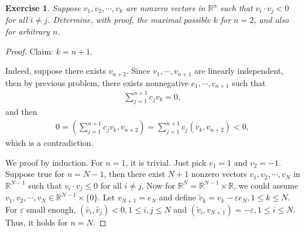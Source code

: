 \documentclass[11pt]{book}
\newtheorem{exercise}{Exercise}[section]
\theoremstyle{definition}
\numberwithin{equation}{chapter}
\begin{document}
\medskip

\begin{exercise}{\bf *}
Suppose $v_1, v_2, \cdots, v_k$ are nonzero vectors in $\mathbb{R}^n$ such that $v_i \cdot v_j < 0$ for all $i \neq j$. Determine, with proof, the maximal possible $k$ for $n = 2$, and also for arbitrary $n$.
\end{exercise}
\begin{proof}
Claim: $k = n + 1$. 

Indeed, suppose there exists $v_{n+2}$. Since $v_1, \cdots, v_{n+1}$ are linearly independent, then by previous problem, there exists nonnegative $c_1, \cdots, c_{n+1}$ such that
\begin{align*}
    \sum^{n+1}_{j=1} c_j v_k = 0,
\end{align*}
and then
\begin{align*}
    0 = \left(\sum^{n+1}_{j=1} c_j v_k, v_{n+2}\right) = \sum^{n+1}_{j=1} c_j \left(v_k, v_{n+2} \right) < 0,
\end{align*}
which is a contradiction. 

We proof by induction. For $n = 1$, it is trivial. Just pick $v_1 = 1$ and $v_2 = -1$. Suppose true for $n = N - 1$, then there exist $N+1$ nonzero vectors $v_1, v_2, \cdots, v_{N}$ in $\mathbb{R}^{N-1}$ such that $v_i \cdot v_j \leq 0$ for all $i \neq j$. Now for $\mathbb{R}^N = \mathbb{R}^{N-1} \times \mathbb{R}$, we could assume $v_1, v_2, \cdots, v_{N} \in \mathbb{R}^{N-1} \times \{0\}$. Let $v_{N+1} = e_N$ and define $\widetilde{v}_k = v_k - \varepsilon e_N, 1 \leq k \leq N$. For $\varepsilon$ small enough, $\left(\tilde{v_i}, \tilde{v_j}\right) < 0, 1 \leq i,j \leq N$ and $\left(\tilde{v}_i, v_{N+1} \right) = - \varepsilon, 1 \leq i \leq N$. Thus, it holds for $n = N$.
\end{proof}

\medskip
\end{document}
